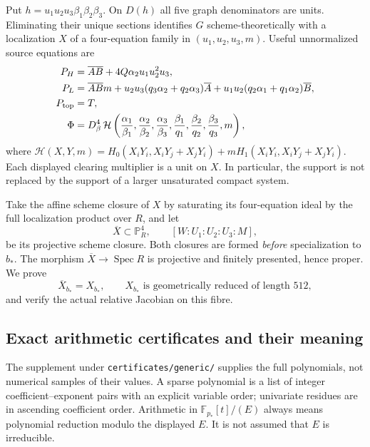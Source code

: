 \documentclass[11pt,a4paper]{article}
\theoremstyle{remark}\newtheorem{remark}[theorem]{Remark}
\newcommand{\Spec}{\operatorname{Spec}}\newcommand{\tr}{\operatorname{tr}}
\newcommand{\Ab}{\overline A}\newcommand{\Bb}{\overline B}
\begin{document}
Put $h=u_1u_2u_3\beta_1\beta_2\beta_3$. On $D(h)$ all five graph
denominators are units. Eliminating their unique sections identifies $G$
scheme-theoretically with a localization $X$ of a four-equation family
in $(u_1,u_2,u_3,m)$. Useful unnormalized source equations are
\begin{align}
 P_H&=\Ab\Bb+4Q\alpha_2u_1u_2^2u_3,\label{generic:PH}\\
 P_L&=\Ab\Bb m+
 u_2u_3(q_3\alpha_2+q_2\alpha_3)\Ab
 +u_1u_2(q_2\alpha_1+q_1\alpha_2)\Bb,\label{generic:PL}\\
 P_{\rm top}&=T,\label{generic:PT}\\
 \Phi&=D_\beta^4\,
  \mathcal H\left(\frac{\alpha_1}{\beta_1},
                    \frac{\alpha_2}{\beta_2},
                    \frac{\alpha_3}{\beta_3},
                    \frac{\beta_1}{q_1},
                    \frac{\beta_2}{q_2},
                    \frac{\beta_3}{q_3},m\right),\label{generic:Phi}
\end{align}
where $\mathcal H(X,Y,m)=H_0(X_iY_i,X_iY_j+X_jY_i)
+mH_1(X_iY_i,X_iY_j+X_jY_i)$. Each displayed clearing multiplier is a
unit on $X$. In particular, the support is not replaced by the support
of a larger unsaturated compact system.

Take the affine scheme closure of $X$ by saturating its four-equation
ideal by the full localization product over $R$, and let
\[
 \overline X\subset\mathbb P^4_R,
 \qquad[W:U_1:U_2:U_3:M],
\]
be its projective scheme closure. Both closures are formed \emph{before}
specialization to $b_*$. The morphism $\overline X\to\Spec R$ is
projective and finitely presented, hence proper. We prove
\begin{equation}\label{generic:controlgoal}
 \overline X_{b_*}=X_{b_*},\qquad
 X_{b_*}\text{ is geometrically reduced of length }512,
\end{equation}
and verify the actual relative Jacobian on this fibre.

\subsection{Exact arithmetic certificates and their meaning}
\label{generic:certificates}
The supplement under \texttt{certificates/generic/} supplies the full
polynomials, not numerical samples of their values. A sparse polynomial
is a list of integer coefficient--exponent pairs with an explicit
variable order; univariate residues are in ascending coefficient order.
Arithmetic in $\mathbb F_{p_*}[t]/(E)$ always means polynomial reduction
modulo the displayed $E$. It is not assumed that $E$ is irreducible.
\end{document}
